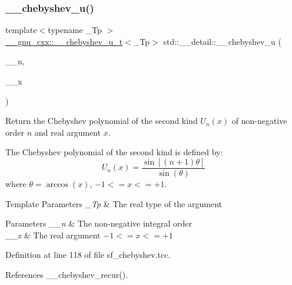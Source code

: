 \mbox{\label{namespacestd_1_1____detail_a0ed32bbc4a1eaf32dc1dc5f423527008}} 
\subsubsection{\texorpdfstring{\+\_\+\+\_\+chebyshev\+\_\+u()}{\_\_chebyshev\_u()}}
{\footnotesize\ttfamily template$<$typename \+\_\+\+Tp $>$ \\
\hyperlink{struct____gnu__cxx_1_1____chebyshev__u__t}{\+\_\+\+\_\+gnu\+\_\+cxx\+::\+\_\+\+\_\+chebyshev\+\_\+u\+\_\+t}$<$\+\_\+\+Tp$>$ std\+::\+\_\+\+\_\+detail\+::\+\_\+\+\_\+chebyshev\+\_\+u (\begin{DoxyParamCaption}\item[{unsigned int}]{\+\_\+\+\_\+n,  }\item[{\+\_\+\+Tp}]{\+\_\+\+\_\+x }\end{DoxyParamCaption})}

Return the Chebyshev polynomial of the second kind $ U_n(x) $ of non-\/negative order $ n $ and real argument $ x $.

The Chebyshev polynomial of the second kind is defined by\+: \[ U_n(x) = \frac{\sin \left[(n+1)\theta \right]}{\sin(\theta)} \] where $ \theta = \arccos(x) $, $ -1 <= x <= +1 $.


\begin{DoxyTemplParams}{Template Parameters}
{\em \+\_\+\+Tp} & The real type of the argument \\
\hline
\end{DoxyTemplParams}

\begin{DoxyParams}{Parameters}
{\em \+\_\+\+\_\+n} & The non-\/negative integral order \\
\hline
{\em \+\_\+\+\_\+x} & The real argument $ -1 <= x <= +1 $ \\
\hline
\end{DoxyParams}


Definition at line 118 of file sf\+\_\+chebyshev.\+tcc.



References \+\_\+\+\_\+chebyshev\+\_\+recur().

\mbox{\label{namespacestd_1_1____detail_a2ed217a1032c75d07ff34949de36d653}} 
